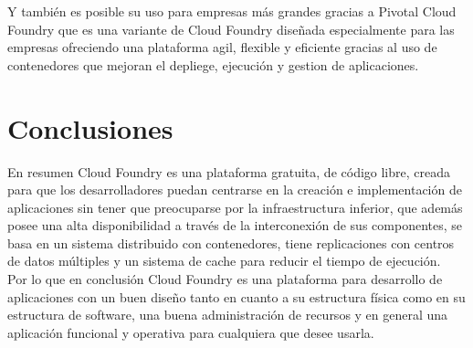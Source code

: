 \documentclass[a4paper,11pt]{article}
\begin{document}
Y también es posible su uso para empresas más grandes gracias a Pivotal Cloud Foundry que es una variante de Cloud Foundry diseñada especialmente para las empresas ofreciendo una plataforma agil, flexible y eficiente gracias al uso de contenedores que mejoran el depliege, ejecución y gestion de aplicaciones.

\section{Conclusiones}
En resumen Cloud Foundry es una plataforma gratuita, de código libre, creada para que los desarrolladores puedan centrarse en la creación e implementación de aplicaciones sin tener que preocuparse por la infraestructura inferior, que además posee una alta disponibilidad a través de la interconexión de sus componentes, se basa en un sistema distribuido con contenedores, tiene replicaciones con centros de datos múltiples y un sistema de cache para reducir el tiempo de ejecución.\\

Por lo que en conclusión Cloud Foundry es una plataforma para desarrollo de aplicaciones con un buen diseño tanto en cuanto a su estructura física como en su estructura de software, una buena administración de recursos y en general una aplicación funcional y operativa para cualquiera que desee usarla.
\end{document}
